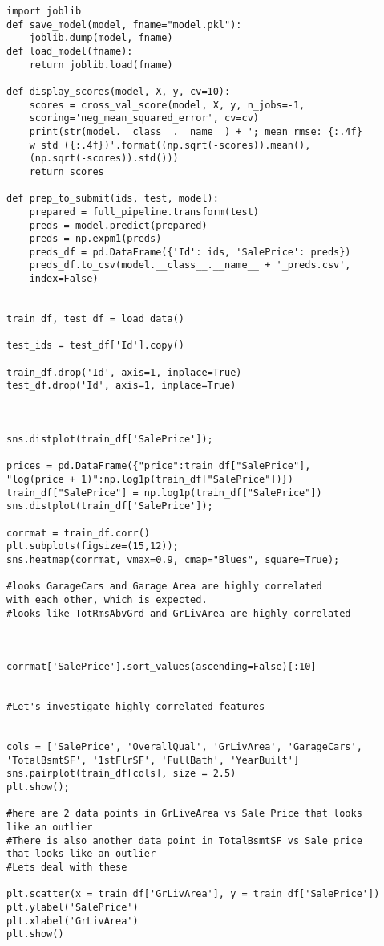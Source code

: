 \documentclass[12pt]{article}%
\begin{document}
\begin{lstlisting}
import joblib
def save_model(model, fname="model.pkl"):
    joblib.dump(model, fname)
def load_model(fname):
    return joblib.load(fname)

def display_scores(model, X, y, cv=10):
    scores = cross_val_score(model, X, y, n_jobs=-1,
    scoring='neg_mean_squared_error', cv=cv)
    print(str(model.__class__.__name__) + '; mean_rmse: {:.4f}
    w std ({:.4f})'.format((np.sqrt(-scores)).mean(),
    (np.sqrt(-scores)).std()))
    return scores 

def prep_to_submit(ids, test, model):
    prepared = full_pipeline.transform(test)
    preds = model.predict(prepared)
    preds = np.expm1(preds)
    preds_df = pd.DataFrame({'Id': ids, 'SalePrice': preds})
    preds_df.to_csv(model.__class__.__name__ + '_preds.csv',
    index=False)
    

train_df, test_df = load_data()

test_ids = test_df['Id'].copy()

train_df.drop('Id', axis=1, inplace=True)
test_df.drop('Id', axis=1, inplace=True)



sns.distplot(train_df['SalePrice']);

prices = pd.DataFrame({"price":train_df["SalePrice"], 
"log(price + 1)":np.log1p(train_df["SalePrice"])})
train_df["SalePrice"] = np.log1p(train_df["SalePrice"])
sns.distplot(train_df['SalePrice']);

corrmat = train_df.corr()
plt.subplots(figsize=(15,12));
sns.heatmap(corrmat, vmax=0.9, cmap="Blues", square=True);

#looks GarageCars and Garage Area are highly correlated 
with each other, which is expected.
#looks like TotRmsAbvGrd and GrLivArea are highly correlated



corrmat['SalePrice'].sort_values(ascending=False)[:10]


#Let's investigate highly correlated features


cols = ['SalePrice', 'OverallQual', 'GrLivArea', 'GarageCars',
'TotalBsmtSF', '1stFlrSF', 'FullBath', 'YearBuilt']
sns.pairplot(train_df[cols], size = 2.5)
plt.show();

#here are 2 data points in GrLiveArea vs Sale Price that looks 
like an outlier
#There is also another data point in TotalBsmtSF vs Sale price
that looks like an outlier
#Lets deal with these

plt.scatter(x = train_df['GrLivArea'], y = train_df['SalePrice'])
plt.ylabel('SalePrice')
plt.xlabel('GrLivArea')
plt.show()


\end{lstlisting}
\end{document}
